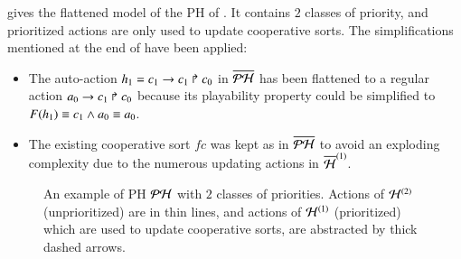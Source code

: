 \begin{example}
   gives the flattened model of the PH of .
  It contains $2$ classes of priority, and prioritized actions are only used to update cooperative sorts.
  The simplifications mentioned at the end of  have been applied:
  \begin{itemize}
    \item The auto-action $h_1 = c_1\rightarrow c_1\Rsh c_0$ in $\overline{\mathcal{PH}}$ has been flattened to a regular action $a_0\rightarrow c_1\Rsh c_0$
      because its playability property could be simplified to $F(h_1) \equiv c_1 \wedge a_0 \equiv a_0$.
    \item The existing cooperative sort $fc$ was kept as in $\overline{\mathcal{PH}}$ to avoid an exploding complexity due to
      the numerous updating actions in $\overline{\mathcal{H}}^{(1)}$.
  \end{itemize}
  
  \begin{figure}[htp]
    \centering
    \caption{
    \label{fig:metazoan-ph}
      An example of PH $\mathcal{PH}$ with $2$ classes of priorities.
      Actions of $\mathcal{H}^{(2)}$ (unprioritized) are in thin lines,
      and actions of $\mathcal{H}^{(1)}$ (prioritized) which are used to update cooperative sorts,
      are abstracted by thick dashed arrows.
    }
  \end{figure}
\end{example}

